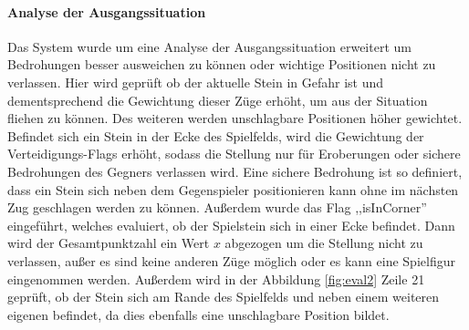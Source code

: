 \paragraph{Analyse der Ausgangssituation}
Das System wurde um eine Analyse der Ausgangssituation erweitert um Bedrohungen besser ausweichen zu können oder wichtige Positionen nicht zu verlassen. Hier wird geprüft ob der aktuelle Stein in Gefahr ist und dementsprechend die Gewichtung dieser Züge erhöht, um aus der Situation fliehen zu können. Des weiteren werden unschlagbare Positionen höher gewichtet. Befindet sich ein Stein in der Ecke des Spielfelds, wird die Gewichtung der Verteidigungs-Flags erhöht, sodass die Stellung nur für Eroberungen oder sichere Bedrohungen des Gegners verlassen wird. Eine sichere Bedrohung ist so definiert, dass ein Stein sich neben dem Gegenspieler positionieren kann ohne im nächsten Zug geschlagen werden zu können. Außerdem wurde das Flag ,,isInCorner'' eingeführt, welches evaluiert, ob der Spielstein sich in einer Ecke befindet. Dann wird der Gesamtpunktzahl ein Wert $x$ abgezogen um die Stellung nicht zu verlassen, außer es sind keine anderen Züge möglich oder es kann eine Spielfigur eingenommen werden. Außerdem wird in der Abbildung \ref{fig:eval2} Zeile 21 geprüft, ob der Stein sich am Rande des Spielfelds und neben einem weiteren eigenen befindet, da dies ebenfalls eine unschlagbare Position bildet.



